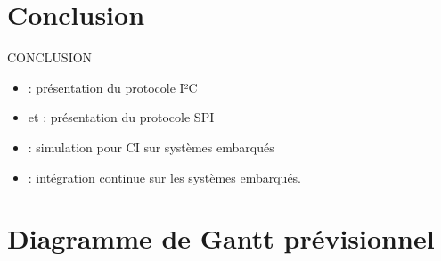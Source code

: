 \documentclass[a4paper]{article}
\begin{document}
\clearpage
\section*{Conclusion}

CONCLUSION




\begin{itemize}
  \item \cite{mankar2014review}: présentation du protocole I²C
  \item \cite{dhaker2018introduction} et \cite{li2014design}: présentation du
    protocole SPI
  \item \cite{engblom2015continuous}: simulation pour CI sur systèmes embarqués
  \item \cite{maartensson2016continuous}: intégration continue sur les systèmes
    embarqués.
\end{itemize}

\clearpage{}
\pagestyle{empty}
\printbibliography[keyword={paper},title={Biliographie}]
\printbibliography[keyword={web},title={Webographie}]

\clearpage
\printglossaries

\appendix

\clearpage{}
\section{Diagramme de Gantt prévisionnel}\label{appendix:expectedgantt}
\end{document}
